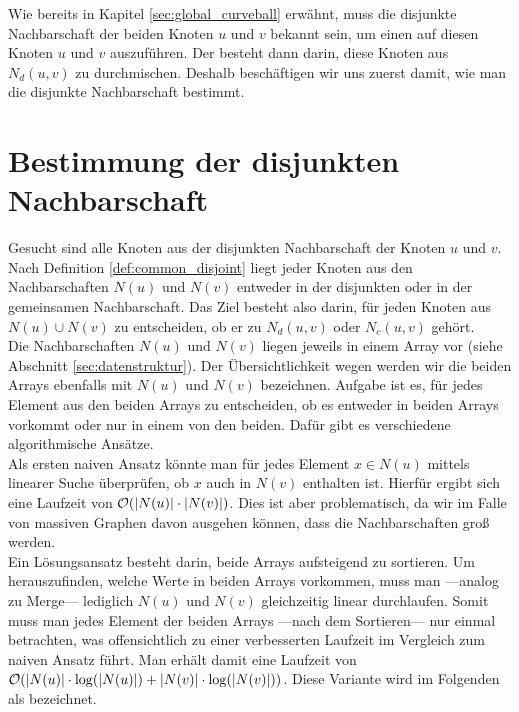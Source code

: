 Wie bereits in Kapitel \ref{sec:global_curveball} erwähnt, muss die disjunkte Nachbarschaft
der beiden Knoten $u$ und $v$ bekannt sein, um einen \ct{} auf diesen Knoten $u$ und $v$
auszuführen. Der \ct{} besteht dann darin, diese Knoten aus $N_{d}(u,v)$ zu durchmischen.
Deshalb beschäftigen wir uns zuerst damit, wie man die disjunkte Nachbarschaft bestimmt.


\section{Bestimmung der disjunkten Nachbarschaft}
\label{sec:common}
Gesucht sind alle Knoten aus der disjunkten Nachbarschaft der Knoten $u$ und $v$.
Nach Definition \ref{def:common_disjoint} liegt jeder Knoten aus den Nachbarschaften $N(u)$ und $N(v)$ 
entweder in der disjunkten oder in der gemeinsamen Nachbarschaft. Das Ziel besteht also darin, 
für jeden Knoten aus $N(u) \cup N(v)$ zu entscheiden, ob er zu $N_{d}(u,v)$ oder $N_{c}(u,v)$ gehört.
\\

Die Nachbarschaften $N(u)$ und $N(v)$ liegen jeweils
in einem Array vor (siehe Abschnitt \ref{sec:datenstruktur}). Der Übersichtlichkeit 
wegen werden wir die beiden
Arrays ebenfalls mit $N(u)$ und $N(v)$ bezeichnen. Aufgabe ist es,
 für jedes Element aus den beiden Arrays zu entscheiden,
ob es entweder in beiden Arrays vorkommt oder nur in einem von den beiden. Dafür 
gibt es verschiedene algorithmische Ansätze.
\\

Als ersten naiven Ansatz könnte man für jedes Element $x \in N(u)$ mittels
 linearer Suche überprüfen, ob $x$ auch in $N(v)$ enthalten ist. Hierfür ergibt sich eine Laufzeit von
$\mathcal{O}(|N(u)|\cdot|N(v)|)$. Dies ist aber problematisch, da wir 
im Falle von massiven Graphen davon ausgehen können, dass die Nachbarschaften
 groß werden. 
\\

Ein Lösungsansatz besteht darin, beide Arrays aufsteigend zu sortieren. 
Um herauszufinden,
welche Werte in beiden Arrays vorkommen, muss man ---analog zu Merge--- lediglich $N(u)$ und $N(v)$
gleichzeitig linear durchlaufen. Somit muss man jedes 
Element der beiden Arrays ---nach dem Sortieren--- 
nur einmal betrachten, was offensichtlich zu einer verbesserten Laufzeit im Vergleich zum naiven
Ansatz führt. Man erhält damit eine Laufzeit von $\mathcal{O}(|N(u)|\cdot \log (|N(u)|)  + |N(v)|\cdot\log(|N(v)|))$. 
Diese Variante wird im Folgenden als \SorSor{} bezeichnet. 
\\


